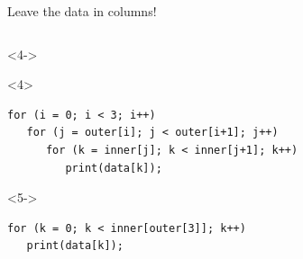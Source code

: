 \documentclass[aspectratio=169]{beamer}
\begin{document}
\begin{frame}[fragile]{Leave the data in columns!}
\begin{columns}[t]
\begin{uncoverenv}<4->
\mbox{\hspace{-0.1 cm}}

\small
\vspace{-0.25 cm}
\begin{onlyenv}<4>
\begin{verbatim}
for (i = 0; i < 3; i++)
   for (j = outer[i]; j < outer[i+1]; j++)
      for (k = inner[j]; k < inner[j+1]; k++)
         print(data[k]);
\end{verbatim}
\end{onlyenv}
\begin{onlyenv}<5->
\begin{verbatim}
for (k = 0; k < inner[outer[3]]; k++)
   print(data[k]);
\end{verbatim}
\end{onlyenv}
\end{uncoverenv}
\end{columns}

\vspace{0.5 cm}
\end{frame}
\end{document}
